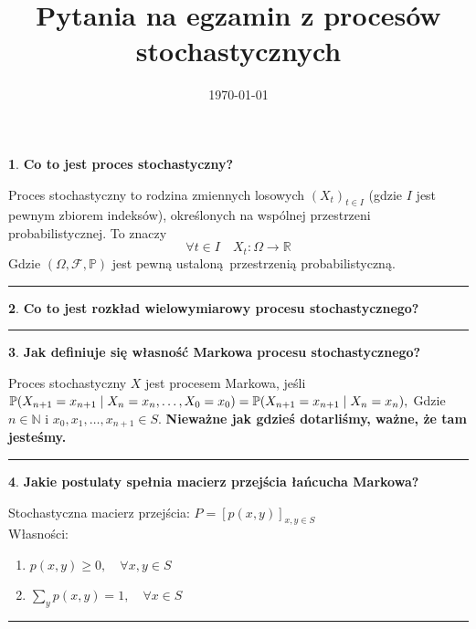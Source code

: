 \documentclass[
    twocolumn,
    twoside,
    fontsize=11pt,
    paper=A0,
    DIV=30
]{scrartcl}
\title{Pytania na egzamin z procesów stochastycznych}
\date{\today}
\theoremstyle{definition}
\newtheorem{pytanie}{}
\theoremstyle{break}
\newenvironment{odpowiedź}{\vspace{-0.7em}}{\vspace{0.3em}\hrule}
\begin{document}

\begin{pytanie}
\textbf{Co to jest proces stochastyczny?}
\end{pytanie}
\begin{odpowiedź}
    Proces stochastyczny to rodzina zmiennych losowych $(X_t)_{t\in I}$
    (gdzie $I$ jest pewnym zbiorem indeksów), określonych na wspólnej
    przestrzeni probabilistycznej. To znaczy \[
    \forall t \in I \quad X_t : \Omega \to \mathbb{R}
    \]
    Gdzie $(\Omega, \mathcal{F}, \mathbb{P})$ jest pewną ustaloną przestrzenią
    probabilistyczną.
\end{odpowiedź}


\begin{pytanie}
\textbf{Co to jest rozkład wielowymiarowy procesu stochastycznego?}
\end{pytanie}
\begin{odpowiedź}
\end{odpowiedź}


\begin{pytanie}
\textbf{Jak definiuje się własność Markowa procesu stochastycznego?}
\end{pytanie}
\begin{odpowiedź}
    Proces stochastyczny $X$ jest procesem Markowa, jeśli $
    \mathbb{P}(X_{n+1}=x_{n+1}\mid X_n=x_n,\ldots ,X_0=x_0)\\
    = \mathbb{P}(X_{n+1}=x_{n+1}\mid X_n=x_n),
    $
    Gdzie $n \in \mathbb{N}$ i $x_0, x_1, \ldots, x_{n+1} \in S$.
    {\bf Nieważne jak gdzieś dotarliśmy, ważne, że tam jesteśmy.}
\end{odpowiedź}


\begin{pytanie}
\textbf{Jakie postulaty spełnia macierz przejścia łańcucha Markowa?}
\end{pytanie}
\begin{odpowiedź}
    Stochastyczna macierz przejścia: $P = [p(x,y)]_{x, y\in S}$\\
    Własności:
    \begin{enumerate}
        \item $p(x, y) \geq 0, \quad \forall x, y \in S$
        \item $\sum_{y} p(x, y) = 1, \quad \forall x \in S$
    \end{enumerate}
\end{odpowiedź}
\end{document}
